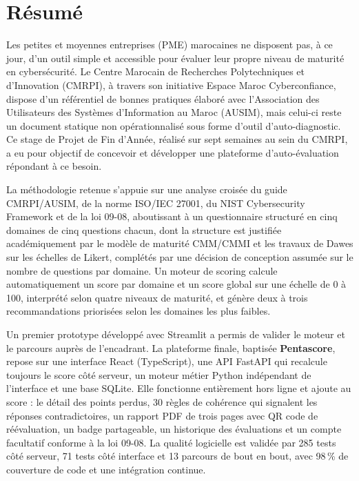\documentclass[12pt, a4paper, oneside]{report}
\begin{document}
\vfill


\chapter*{Résumé}

Les petites et moyennes entreprises (PME) marocaines ne disposent pas, à ce jour, d'un outil simple et accessible pour évaluer leur propre niveau de maturité en cybersécurité. Le Centre Marocain de Recherches Polytechniques et d'Innovation (CMRPI), à travers son initiative Espace Maroc Cyberconfiance, dispose d'un référentiel de bonnes pratiques élaboré avec l'Association des Utilisateurs des Systèmes d'Information au Maroc (AUSIM), mais celui-ci reste un document statique non opérationnalisé sous forme d'outil d'auto-diagnostic. Ce stage de Projet de Fin d'Année, réalisé sur sept semaines au sein du CMRPI, a eu pour objectif de concevoir et développer une plateforme d'auto-évaluation répondant à ce besoin.

La méthodologie retenue s'appuie sur une analyse croisée du guide CMRPI/AUSIM, de la norme ISO/IEC 27001, du NIST Cybersecurity Framework et de la loi 09-08, aboutissant à un questionnaire structuré en cinq domaines de cinq questions chacun, dont la structure est justifiée académiquement par le modèle de maturité CMM/CMMI et les travaux de Dawes sur les échelles de Likert, complétés par une décision de conception assumée sur le nombre de questions par domaine. Un moteur de scoring calcule automatiquement un score par domaine et un score global sur une échelle de 0 à 100, interprété selon quatre niveaux de maturité, et génère deux à trois recommandations priorisées selon les domaines les plus faibles.

Un premier prototype développé avec Streamlit a permis de valider le moteur et le parcours auprès de l'encadrant. La plateforme finale, baptisée \textbf{Pentascore}, repose sur une interface React (TypeScript), une API FastAPI qui recalcule toujours le score côté serveur, un moteur métier Python indépendant de l'interface et une base SQLite. Elle fonctionne entièrement hors ligne et ajoute au score : le détail des points perdus, 30 règles de cohérence qui signalent les réponses contradictoires, un rapport PDF de trois pages avec QR code de réévaluation, un badge partageable, un historique des évaluations et un compte facultatif conforme à la loi 09-08. La qualité logicielle est validée par 285 tests côté serveur, 71 tests côté interface et 13 parcours de bout en bout, avec 98\,\% de couverture de code et une intégration continue.
\end{document}

